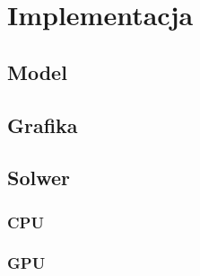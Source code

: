 \chapter{Implementacja}
\section{Model}
\section{Grafika}
\section{Solwer}
\subsection{CPU}
\subsection{GPU}

